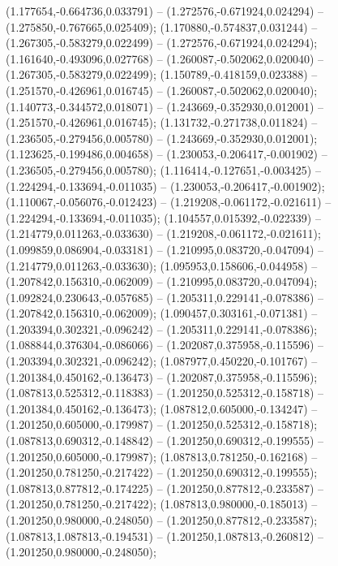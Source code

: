  (1.177654,-0.664736,0.033791) -- (1.272576,-0.671924,0.024294) -- (1.275850,-0.767665,0.025409);
 (1.170880,-0.574837,0.031244) -- (1.267305,-0.583279,0.022499) -- (1.272576,-0.671924,0.024294);
 (1.161640,-0.493096,0.027768) -- (1.260087,-0.502062,0.020040) -- (1.267305,-0.583279,0.022499);
 (1.150789,-0.418159,0.023388) -- (1.251570,-0.426961,0.016745) -- (1.260087,-0.502062,0.020040);
 (1.140773,-0.344572,0.018071) -- (1.243669,-0.352930,0.012001) -- (1.251570,-0.426961,0.016745);
 (1.131732,-0.271738,0.011824) -- (1.236505,-0.279456,0.005780) -- (1.243669,-0.352930,0.012001);
 (1.123625,-0.199486,0.004658) -- (1.230053,-0.206417,-0.001902) -- (1.236505,-0.279456,0.005780);
 (1.116414,-0.127651,-0.003425) -- (1.224294,-0.133694,-0.011035) -- (1.230053,-0.206417,-0.001902);
 (1.110067,-0.056076,-0.012423) -- (1.219208,-0.061172,-0.021611) -- (1.224294,-0.133694,-0.011035);
 (1.104557,0.015392,-0.022339) -- (1.214779,0.011263,-0.033630) -- (1.219208,-0.061172,-0.021611);
 (1.099859,0.086904,-0.033181) -- (1.210995,0.083720,-0.047094) -- (1.214779,0.011263,-0.033630);
 (1.095953,0.158606,-0.044958) -- (1.207842,0.156310,-0.062009) -- (1.210995,0.083720,-0.047094);
 (1.092824,0.230643,-0.057685) -- (1.205311,0.229141,-0.078386) -- (1.207842,0.156310,-0.062009);
 (1.090457,0.303161,-0.071381) -- (1.203394,0.302321,-0.096242) -- (1.205311,0.229141,-0.078386);
 (1.088844,0.376304,-0.086066) -- (1.202087,0.375958,-0.115596) -- (1.203394,0.302321,-0.096242);
 (1.087977,0.450220,-0.101767) -- (1.201384,0.450162,-0.136473) -- (1.202087,0.375958,-0.115596);
 (1.087813,0.525312,-0.118383) -- (1.201250,0.525312,-0.158718) -- (1.201384,0.450162,-0.136473);
 (1.087812,0.605000,-0.134247) -- (1.201250,0.605000,-0.179987) -- (1.201250,0.525312,-0.158718);
 (1.087813,0.690312,-0.148842) -- (1.201250,0.690312,-0.199555) -- (1.201250,0.605000,-0.179987);
 (1.087813,0.781250,-0.162168) -- (1.201250,0.781250,-0.217422) -- (1.201250,0.690312,-0.199555);
 (1.087813,0.877812,-0.174225) -- (1.201250,0.877812,-0.233587) -- (1.201250,0.781250,-0.217422);
 (1.087813,0.980000,-0.185013) -- (1.201250,0.980000,-0.248050) -- (1.201250,0.877812,-0.233587);
 (1.087813,1.087813,-0.194531) -- (1.201250,1.087813,-0.260812) -- (1.201250,0.980000,-0.248050);
